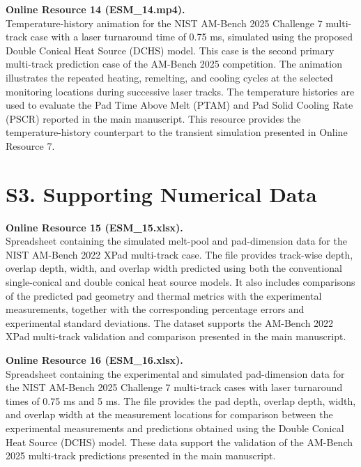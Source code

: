 \documentclass[11pt]{article}
\begin{document}
\medskip

\textbf{Online Resource 14 (ESM\_14.mp4).}\\
Temperature-history animation for the NIST AM-Bench 2025 Challenge 7
multi-track case with a laser turnaround time of 0.75 ms, simulated
using the proposed Double Conical Heat Source (DCHS) model. This case
is the second primary multi-track prediction case of the AM-Bench 2025
competition. The animation illustrates the repeated heating, remelting,
and cooling cycles at the selected monitoring locations during
successive laser tracks. The temperature histories are used to evaluate
the Pad Time Above Melt (PTAM) and Pad Solid Cooling Rate (PSCR)
reported in the main manuscript. This resource provides the
temperature-history counterpart to the transient simulation presented
in Online Resource 7.

\medskip

\section*{S3. Supporting Numerical Data}

\textbf{Online Resource 15 (ESM\_15.xlsx).}\\
Spreadsheet containing the simulated melt-pool and pad-dimension data for the
NIST AM-Bench 2022 XPad multi-track case. The file provides track-wise depth,
overlap depth, width, and overlap width predicted using both the conventional
single-conical and double conical heat source models. It also includes
comparisons of the predicted pad geometry and thermal metrics with the
experimental measurements, together with the corresponding percentage errors
and experimental standard deviations. The dataset supports the AM-Bench 2022
XPad multi-track validation and comparison presented in the main manuscript.

\medskip

\textbf{Online Resource 16 (ESM\_16.xlsx).}\\
Spreadsheet containing the experimental and simulated pad-dimension data for
the NIST AM-Bench 2025 Challenge 7 multi-track cases with laser turnaround
times of 0.75 ms and 5 ms. The file provides the pad depth, overlap depth,
width, and overlap width at the measurement locations for comparison between
the experimental measurements and predictions obtained using the Double
Conical Heat Source (DCHS) model. These data support the validation of the
AM-Bench 2025 multi-track predictions presented in the main manuscript.
\end{document}
